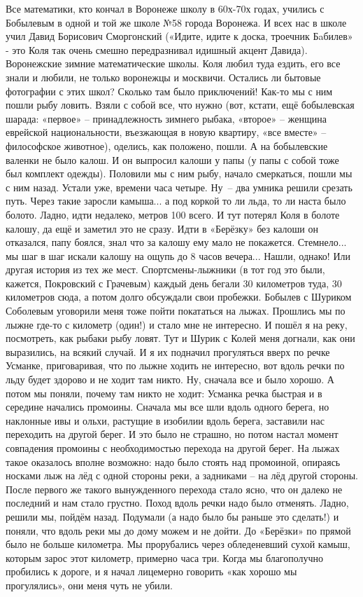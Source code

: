 Все математики, кто кончал в Воронеже школу в 60х-70х годах, учились с Бобылевым в одной и той же школе №58 города Воронежа. И всех нас в школе учил Давид Борисович Сморгонский («Идите, идите к доска, троечник Бaбилев» - это Коля так очень смешно передразнивал идишный акцент Давида). Воронежские зимние математические школы. Коля любил туда ездить, его все знали и любили, не только воронежцы и москвичи. Остались ли бытовые фотографии с этих школ? Сколько там было приключений! Как-то мы с ним пошли рыбу ловить. Взяли с собой все, что нужно (вот, кстати, ещё бобылевская шарада: «первое» – принадлежность зимнего рыбака, «второе» – женщина еврейской национальности, въезжающая в новую квартиру, «все вместе» – философское животное), оделись, как положено, пошли. А на бобылевские валенки не было калош. И он выпросил калоши у папы (у папы с собой тоже был комплект одежды). Половили мы с ним рыбу, начало смеркаться, пошли мы с ним назад. Устали уже, времени часа четыре. Ну~– два умника решили срезать путь. Через такие заросли камыша... а под коркой то ли льда, то ли наста было болото. Ладно, идти недалеко, метров 100 всего. И тут потерял Коля в болоте калошу, да ещё и заметил это не сразу. Идти в «Берёзку» без калоши он отказался, папу боялся, знал что за калошу ему мало не покажется. Стемнело... мы шаг в шаг искали калошу на ощупь до 8 часов вечера... Нашли, однако! Или другая история из тех же мест. Спортсмены-лыжники (в тот год это были, кажется, Покровский с Грачевым) каждый день бегали 30 километров туда, 30 километров сюда, а потом долго обсуждали свои пробежки. Бобылев с Шуриком Соболевым уговорили меня тоже пойти покататься на лыжах. Прошлись мы по лыжне где-то с километр (один!) и стало мне не интересно. И пошёл я на реку, посмотреть, как рыбаки рыбу ловят. Тут и Шурик с Колей меня догнали, как они выразились, на всякий случай. И я их подначил прогуляться вверх по речке Усманке, приговаривая, что по лыжне ходить не интересно, вот вдоль речки по льду будет здорово и не ходит там никто. Ну, сначала все и было хорошо. А потом мы поняли, почему там никто не ходит: Усманка речка быстрая и в середине начались промоины. Сначала мы все шли вдоль одного берега, но наклонные ивы и ольхи, растущие в изобилии вдоль берега, заставили нас переходить на другой берег. И это было не страшно, но потом настал момент совпадения промоины с необходимостью перехода на другой берег. На лыжах такое оказалось вполне возможно: надо было стоять над промоиной, опираясь носками лыж на лёд с одной стороны реки, а задниками – на лёд другой стороны. После первого же такого вынужденного перехода стало ясно, что он далеко не последний и нам стало грустно. Поход вдоль речки надо было отменять. Ладно, решили мы, пойдём назад. Подумали (а надо было бы раньше это сделать!) и поняли, что вдоль реки мы до дому можем и не дойти. До «Берёзки» по прямой было не больше километра. Мы прорубались через обледеневший сухой камыш, которым зарос этот километр, примерно часа три. Когда мы благополучно пробились к дороге, и я начал лицемерно говорить «как хорошо мы прогулялись», они меня чуть не убили.

